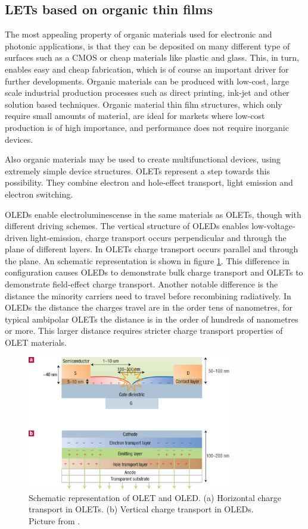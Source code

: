 \subsection{LETs based on organic thin films}\label{sec:thinfilms} %
The most appealing property of organic materials used for electronic and photonic applications, is that they can be deposited on many different type of surfaces such as a CMOS or cheap materials like plastic and glass. This, in turn, enables easy and cheap fabrication, which is of course an important driver for further developments. Organic materials can be produced with low-cost, large scale industrial production processes such as direct printing, ink-jet and other solution based techniques. Organic material thin film structures, which only require small amounts of material, are ideal for markets where low-cost production is of high importance, and performance does not require inorganic devices.

Also organic materials may be used to create multifunctional devices, using extremely simple device structures. OLETs represent a step towards this possibility. They combine electron and hole-effect transport, light emission and electron switching.

OLEDs enable electroluminescense in the same materials as OLETs, though with different driving schemes. The vertical structure of OLEDs enables low-voltage-driven light-emission, charge transport occurs perpendicular and through the plane of different layers. In OLETs charge transport occurs parallel and through the plane. An schematic representation is shown in figure \ref{fig:thinfilms}. This difference in configuration causes OLEDs to demonstrate bulk charge transport and OLETs to demonstrate field-effect charge transport. Another notable difference is the distance the minority carriers need to travel before recombining radiatively. In OLEDs the distance the charges travel are in the order tens of nanometres, for typical ambipolar OLETs the distance is in the order of hundreds of nanometres or more. This larger distance requires stricter charge transport properties of OLET materials.

\begin{figure}[!ht]
 \begin{center}
  \includegraphics[width=0.8\textwidth]{fig_2}
  \caption{Schematic representation of OLET and OLED. (a) Horizontal charge transport in OLETs. (b) Vertical charge transport in OLEDs. Picture from \citet{Muccini}.}
  \label{fig:thinfilms}
 \end{center}
\end{figure}

